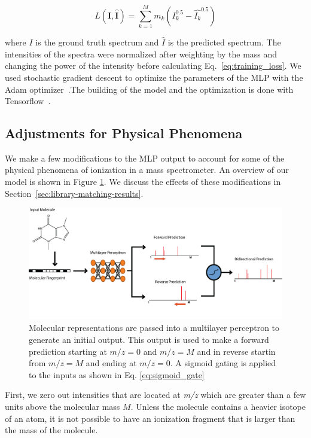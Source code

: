 \documentclass{article}
\begin{document}
\begin{equation}\label{eq:training_loss}
    L(\boldsymbol{I}, \hat{\boldsymbol{I}}) = \sum_{k=1}^{M} m_k (I_k^{0.5} - \hat{I_k}^{0.5})
\end{equation}

where $I$ is the ground truth spectrum and $\hat{I}$ is the predicted spectrum. The intensities of the spectra were normalized after weighting by the mass and changing the power of the intensity before calculating Eq.~\eqref{eq:training_loss}. We used stochastic gradient descent to optimize the parameters of the MLP with the Adam optimizer~\cite{Kingma_adam_optimizer}.The building of the model and the optimization is done with Tensorflow~\cite{tensorflow2015-whitepaper}.

\subsection{Adjustments for Physical Phenomena}\label{sec:ms_physical_phenomena}

We make a few modifications to the MLP output to account for some of the physical phenomena of ionization in a mass spectrometer. An overview of our model is shown in Figure \ref{fig:model_prediction}. We discuss the effects of these modifications in Section~\ref{sec:library-matching-results}.

\begin{figure}[h]
    \centering
    \includegraphics[width=0.8\linewidth]{./figures/Model_prediction.png}
    \caption[Neural Electron Ionization MS Prediction Model]{Molecular representations are passed into a multilayer perceptron to generate an initial output. This output is used to make a forward prediction starting at $\textit{m/z}=0$ and $\textit{m/z}=M$ and in reverse startin from $\textit{m/z}=M$ and ending at $\textit{m/z}=0$. A sigmoid gating is applied to the inputs as shown in Eq. \ref{eq:sigmoid_gate}}
    \label{fig:model_prediction}
\end{figure}

First, we zero out intensities that are located at \textit{m/z} which are greater than a few units above the molecular mass $M$. Unless the molecule contains a heavier isotope of an atom, it is not possible to have an ionization fragment that is larger than the mass of the molecule.
\end{document}
